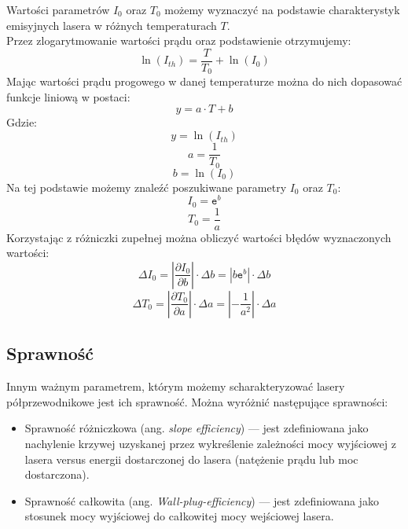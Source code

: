 \documentclass[a4paper, portrait,12pt]{report}
\begin{document}
Wartości parametrów $I_0$ oraz $T_0$ możemy wyznaczyć na podstawie charakterystyk
emisyjnych lasera w różnych temperaturach $T$. \\
Przez zlogarytmowanie wartości prądu oraz podstawienie otrzymujemy:
\begin{equation}
\ln(I_{th}) =    \frac{T}{T_0}  + \ln(I_0)
\end{equation}
Mając wartości prądu progowego w danej temperaturze  można do nich dopasować funkcje liniową w postaci:
\begin{equation}
y = a \cdot T + b
\end{equation}
Gdzie:
\begin{equation}
y = \ln(I_{th})
\end{equation}
\begin{equation}
a = \frac{1}{T_0}
\end{equation}
\begin{equation}
b = \ln(I_0)
\end{equation}
Na tej podstawie możemy znaleźć poszukiwane parametry $I_0$ oraz $T_0$:
\begin{equation}
I_0 = \mathtt{e}^b
\end{equation}
\begin{equation}
T_0 = \frac{1}{a}
\end{equation}
Korzystając z różniczki zupełnej można obliczyć wartości błędów wyznaczonych wartości:
\begin{equation}
\Delta I_0 = \left\lvert \frac{\partial I_{0}}{\partial b} \right\rvert \cdot \Delta b = | b \mathtt{e}^b | \cdot \Delta b
\end{equation}
\begin{equation}
\Delta T_0 = \left\lvert \frac{\partial T_{0}}{\partial a} \right\rvert \cdot \Delta a = \left\lvert -\frac{1}{a^2} \right\rvert \cdot \Delta a
\end{equation}
\subsection{Sprawność}
Innym ważnym parametrem, którym możemy scharakteryzować lasery półprzewodnikowe jest ich sprawność. Można wyróżnić następujące sprawności:
\begin{itemize}
\item Sprawność różniczkowa (ang. \textit{slope efficiency}) --- jest zdefiniowana jako nachylenie krzywej uzyskanej przez wykreślenie zależności mocy wyjściowej z lasera versus energii dostarczonej do lasera (natężenie prądu lub moc dostarczona).
\item Sprawność całkowita (ang. \textit{Wall-plug-efficiency}) --- jest zdefiniowana jako stosunek mocy wyjściowej do całkowitej mocy wejściowej lasera.
\end{itemize}
\end{document}
